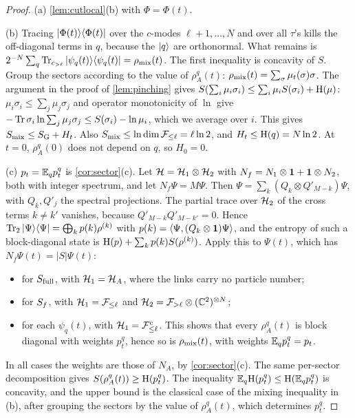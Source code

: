 \begin{proof}
(a) \cref{lem:cutlocal}(b) with $\Phi=\Phi(t)$.

(b) Tracing $|\Phi(t)\rangle\langle \Phi(t)|$ over the $c$-modes $\ell+1,\dots,N$ and over all $\tau$'s kills the
off-diagonal terms in $q$, because the $|q\rangle$ are orthonormal.  What remains is
$2^{-N}\sum_q\operatorname{Tr}_{c_{>\ell}}|\psi_q(t)\rangle\langle \psi_q(t)|=\rho_{\rm mix}(t)$.  The first inequality is concavity of $S$.
Group the sectors according to the value of $\rho^q_A(t)$: $\rho_{\rm mix}(t)=\sum_\sigma\mu_t(\sigma)\sigma$.
The argument in the proof of \cref{lem:pinching} gives $S(\sum_i\mu_i\sigma_i)\le\sum_i\mu_iS(\sigma_i)+\mathrm{H}(\mu)$:
$\mu_i\sigma_i\le\sum_j\mu_j\sigma_j$ and operator monotonicity of $\ln$ give
$-\operatorname{Tr}\sigma_i\ln\sum_j\mu_j\sigma_j\le S(\sigma_i)-\ln\mu_i$, which we average over $i$.  This gives
$S_{\mathrm{mix}}\le S_{\mathrm{G}}+H_t$.  Also $S_{\mathrm{mix}}\le\ln\dim\mathcal{F}_{\le\ell}=\ell\ln2$, and $H_t\le\mathrm{H}(q)=N\ln2$.  At $t=0$,
$\rho^q_A(0)$ does not depend on $q$, so $H_0=0$.

(c) $p_t=\mathbb{E}_qp^q_t$ is \cref{cor:sector}(c).  Let $\mathcal{H}=\mathcal{H}_1\otimes\mathcal{H}_2$ with $N_f=N_1\otimes\mathbf{1}+\mathbf{1}\otimes N_2$, both
with integer spectrum, and let $N_f\Psi=M\Psi$.  Then $\Psi=\sum_k(Q_k\otimes Q'_{M-k})\Psi$, with $Q_k,Q'_j$ the
spectral projections.  The partial trace over $\mathcal{H}_2$ of the cross terms $k\neq k'$ vanishes, because
$Q'_{M-k}Q'_{M-k'}=0$.  Hence $\operatorname{Tr}_2|\Psi\rangle\langle \Psi|=\bigoplus_kp(k)\rho^{(k)}$ with
$p(k)=\langle\Psi,(Q_k\otimes\mathbf{1})\Psi\rangle$, and the entropy of such a block-diagonal state is
$\mathrm{H}(p)+\sum_kp(k)S(\rho^{(k)})$.  Apply this to $\Psi(t)$, which has $N_f\Psi(t)=|S|\Psi(t)$:
\begin{itemize}
\item for $S_{\mathrm{full}}$, with $\mathcal{H}_1=\mathcal{H}_A$, where the links carry no particle number;
\item for $S_{f}$, with $\mathcal{H}_1=\mathcal{F}_{\le\ell}$ and $\mathcal{H}_2=\mathcal{F}_{>\ell}\otimes(\mathbb{C}^2)^{\otimes N}$;
\item for each $\psi_q(t)$, with $\mathcal{H}_1=\mathcal{F}^c_{\le\ell}$.  This shows that every $\rho^q_A(t)$ is block diagonal
with weights $p^q_t$, hence so is $\rho_{\rm mix}(t)$, with weights $\mathbb{E}_qp^q_t=p_t$.
\end{itemize}
In all cases the weights are those of $N_A$, by \cref{cor:sector}(c).  The same per-sector decomposition gives
$S(\rho^q_A(t))\ge\mathrm{H}(p^q_t)$.  The inequality $\mathbb{E}_q\mathrm{H}(p^q_t)\le\mathrm{H}(\mathbb{E}_qp^q_t)$ is concavity, and the upper
bound is the classical case of the mixing inequality in (b), after grouping the sectors by the value of
$\rho^q_A(t)$, which determines $p^q_t$.


\end{proof}
